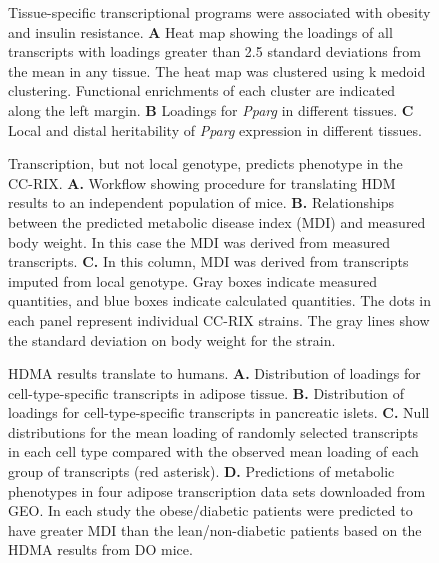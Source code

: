 \documentclass[
]{article}
\begin{document}
\begin{figure}[ht!]
\caption{Tissue-specific transcriptional programs were associated 
with obesity and insulin resistance. \textbf{A} Heat map showing 
the loadings of all transcripts with loadings greater than 2.5 
standard deviations from the mean in any tissue. The heat map was 
clustered using k medoid clustering. Functional enrichments of each 
cluster are indicated along the left margin. \textbf{B} Loadings for 
\textit{Pparg} in different tissues. \textbf{C} Local and distal 
heritability of \textit{Pparg} expression in different tissues.
}
\label{fig:toa}
\end{figure}

\begin{figure}[ht!]
\caption{Transcription, but not local genotype, predicts 
phenotype in the CC-RIX. \textbf{A.} Workflow showing 
procedure for translating HDM results to an independent 
population of mice. \textbf{B.} Relationships between the 
predicted metabolic disease index (MDI) and measured 
body weight. In this case the MDI was derived from 
measured transcripts. \textbf{C.} In this column, MDI 
was derived from transcripts imputed from local genotype. 
Gray boxes indicate measured quantities, and blue boxes 
indicate calculated quantities. The dots in each panel 
represent individual CC-RIX strains. The gray lines show 
the standard deviation on body weight for the strain.
}
\label{fig:cc_prediction}
\end{figure}

\begin{figure}[ht!]
\caption{HDMA results translate to humans. \textbf{A.} Distribution of 
loadings for cell-type-specific transcripts in adipose tissue. \textbf{B.} 
Distribution of loadings for cell-type-specific transcripts in pancreatic 
islets. \textbf{C.} Null distributions for the mean loading of 
randomly selected transcripts in each cell type compared with the observed 
mean loading of each group of transcripts (red asterisk). \textbf{D.} 
Predictions of metabolic phenotypes in four adipose transcription data 
sets downloaded from GEO. In each study the obese/diabetic patients were 
predicted to have greater MDI than the lean/non-diabetic 
patients based on the HDMA results from DO mice.
}
\label{fig:human_translation}
\end{figure}
\end{document}
